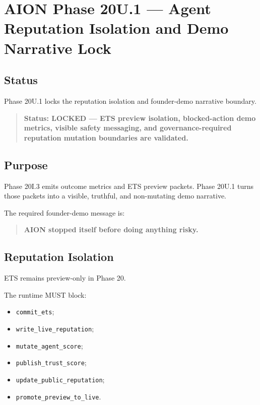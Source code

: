 \section{AION Phase 20U.1 --- Agent Reputation Isolation and Demo Narrative Lock}
\label{sec:aion-phase20u1-reputation-demo-narrative}

\subsection{Status}

Phase 20U.1 locks the reputation isolation and founder-demo narrative boundary.

\begin{quote}
\textbf{Status: LOCKED --- ETS preview isolation, blocked-action demo metrics, visible safety messaging, and governance-required reputation mutation boundaries are validated.}
\end{quote}

\subsection{Purpose}

Phase 20I.3 emits outcome metrics and ETS preview packets. Phase 20U.1 turns those packets into a visible, truthful, and non-mutating demo narrative.

The required founder-demo message is:

\begin{quote}
\textbf{AION stopped itself before doing anything risky.}
\end{quote}

\subsection{Reputation Isolation}

ETS remains preview-only in Phase 20.

The runtime MUST block:

\begin{itemize}
  \item \texttt{commit\_ets};
  \item \texttt{write\_live\_reputation};
  \item \texttt{mutate\_agent\_score};
  \item \texttt{publish\_trust\_score};
  \item \texttt{update\_public\_reputation};
  \item \texttt{promote\_preview\_to\_live}.
\end{itemize}


